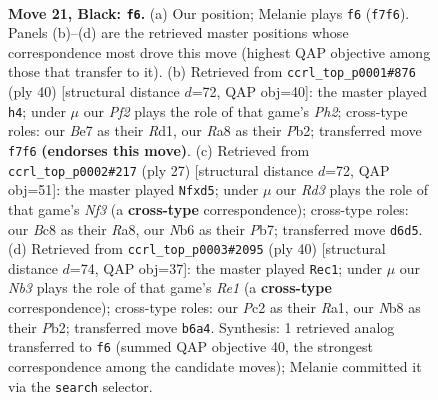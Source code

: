 \documentclass[11pt]{article}
\begin{document}
\clearpage

\begin{figure}[p]\centering
\begin{subfigure}{0.46\textwidth}\centering
\resizebox{\linewidth}{!}{%
\newchessgame
\chessboard[
  setfen={rnb3k1/1p2bp2/pn1rp1p1/7p/8/1P2P1P1/P1pNP2P/R1B1RK1B b - - 1 21},
  showmover=false,
  pgfstyle=straightmove, color=movearrow, markmove={f7-f6}
]}
\caption{}
\end{subfigure}\hfill
\begin{subfigure}{0.46\textwidth}\centering
\resizebox{\linewidth}{!}{%
\newchessgame
\chessboard[
  setfen={r1b1r1k1/1p3pp1/2p4p/p1n5/P2N4/R3PP2/1P2B1PP/3R2K1 w - - 1 21},
  showmover=false,
  pgfstyle=straightmove, color=movearrow, markmove={h2-h4}
]}
\caption{}
\end{subfigure}
\\[4pt]
\begin{subfigure}{0.46\textwidth}\centering
\resizebox{\linewidth}{!}{%
\newchessgame
\chessboard[
  setfen={r1b1k2r/pp2ppbp/5np1/3P4/1n6/1P3NP1/1P2PPBP/RNBR2K1 b kq - 2 14},
  showmover=false,
  pgfstyle=straightmove, color=movearrow, markmove={f6-d5}
]}
\caption{}
\end{subfigure}\hfill
\begin{subfigure}{0.46\textwidth}\centering
\resizebox{\linewidth}{!}{%
\newchessgame
\chessboard[
  setfen={3rr1k1/1bp2ppp/5n2/2b1p3/Pp2P3/5NNP/1PB2PP1/R3R1K1 w - - 0 21},
  showmover=false,
  pgfstyle=straightmove, color=movearrow, markmove={e1-c1}
]}
\caption{}
\end{subfigure}
\caption{\textbf{Move 21, Black: \texttt{f6}.} (a) Our position; Melanie plays \texttt{f6} (\texttt{f7f6}). Panels (b)--(d) are the retrieved master positions whose correspondence most drove this move (highest QAP objective among those that transfer to it). (b) Retrieved from \texttt{ccrl\_top\_p0001\#876} (ply 40) [structural distance $d$=72, QAP obj=40]: the master played \texttt{h4}; under $\mu$ our \emph{Pf2} plays the role of that game's \emph{Ph2}; cross-type roles: our \emph{B}e7 as their \emph{R}d1, our \emph{R}a8 as their \emph{P}b2; transferred move \texttt{f7f6} \textbf{(endorses this move)}. (c) Retrieved from \texttt{ccrl\_top\_p0002\#217} (ply 27) [structural distance $d$=72, QAP obj=51]: the master played \texttt{Nfxd5}; under $\mu$ our \emph{Rd3} plays the role of that game's \emph{Nf3} (a \textbf{cross-type} correspondence); cross-type roles: our \emph{B}c8 as their \emph{R}a8, our \emph{N}b6 as their \emph{P}b7; transferred move \texttt{d6d5}. (d) Retrieved from \texttt{ccrl\_top\_p0003\#2095} (ply 40) [structural distance $d$=74, QAP obj=37]: the master played \texttt{Rec1}; under $\mu$ our \emph{Nb3} plays the role of that game's \emph{Re1} (a \textbf{cross-type} correspondence); cross-type roles: our \emph{P}c2 as their \emph{R}a1, our \emph{N}b8 as their \emph{P}b2; transferred move \texttt{b6a4}. Synthesis: 1 retrieved analog transferred to \texttt{f6} (summed QAP objective 40, the strongest correspondence among the candidate moves); Melanie committed it via the \texttt{search} selector.}
\label{fig:thought-m41}
\end{figure}
\end{document}
